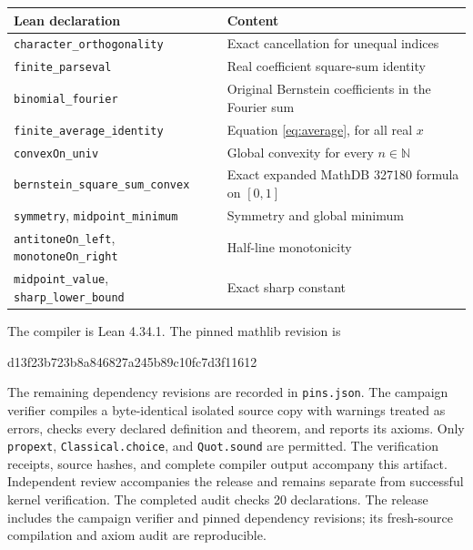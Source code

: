 \documentclass[11pt]{article}
\newcommand{\N}{\mathbb N}
\begin{document}
\begin{center}
\small
\begin{tabular}{@{}p{}p{}@{}}
\toprule
Lean declaration & Content \\
\midrule
\nolinkurl{character_orthogonality} & Exact cancellation for unequal indices \\
\nolinkurl{finite_parseval} & Real coefficient square-sum identity \\
\nolinkurl{binomial_fourier} & Original Bernstein coefficients in the Fourier sum \\
\nolinkurl{finite_average_identity} & Equation \eqref{eq:average}, for all real $x$ \\
\nolinkurl{convexOn_univ} & Global convexity for every $n\in\N$ \\
\nolinkurl{bernstein_square_sum_convex} & Exact expanded MathDB 327180 formula on $[0,1]$ \\
\nolinkurl{symmetry}, \nolinkurl{midpoint_minimum} & Symmetry and global minimum \\
\nolinkurl{antitoneOn_left}, \nolinkurl{monotoneOn_right} & Half-line monotonicity \\
\nolinkurl{midpoint_value}, \nolinkurl{sharp_lower_bound} & Exact sharp constant \\
\bottomrule
\end{tabular}
\end{center}

The compiler is Lean 4.34.1. The pinned mathlib revision is
\begin{center}\small\ttfamily
d13f23b723b8a846827a245b89c10fc7d3f11612
\end{center}
The remaining dependency revisions are recorded in \nolinkurl{pins.json}.
The campaign verifier compiles
a byte-identical isolated source copy with warnings treated as errors,
checks every declared definition and theorem, and reports its axioms.
Only \nolinkurl{propext}, \nolinkurl{Classical.choice}, and \nolinkurl{Quot.sound}
are permitted. The verification receipts, source hashes, and complete
compiler output accompany this artifact. Independent review accompanies the release and remains separate from successful kernel verification. The completed audit checks
20 declarations. The release includes the campaign verifier and pinned dependency revisions; its fresh-source compilation and axiom audit are reproducible.
\end{document}
